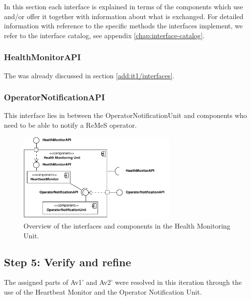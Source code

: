 \npar In this section each interface is explained in terms of the components
which use and/or offer it together with information about what is exchanged. For
detailed information with reference to the specific methods the interfaces
implement, we refer to the interface catalog, see appendix
\ref{chap:interface-catalog}.

\subsubsection{HealthMonitorAPI}

\npar The  was already discussed in section
\ref{add:it1/interfaces}.

\subsubsection{OperatorNotificationAPI}

\npar This interface lies in between the OperatorNotificationUnit and components
who need to be able to notify a ReMeS operator. 

\begin{figure}[H]
	\begin{centering}
		\includegraphics[width=0.7\textwidth]{figs/add-it9-interfaces.pdf}
		\caption{Overview of the interfaces and components in the Health Monitoring
		Unit.}
		\label{fig:it9/interfaces}
	\end{centering}
\end{figure}

\subsection{Step 5: Verify and refine}
\label{add:it9/verification}

\npar The assigned parts of Av1' and Av2' were resolved in this iteration
through the use of the Heartbeat Monitor and the Operator Notification Unit.
